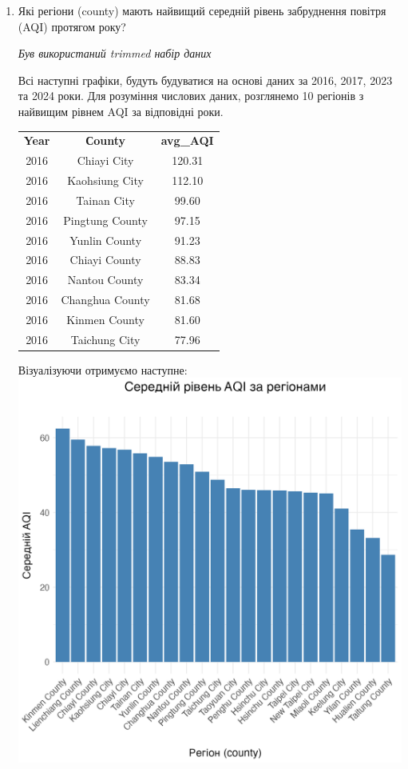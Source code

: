 \documentclass{article}
\begin{document}
\begin{enumerate}
    \item Які регіони (county) мають найвищий середній рівень забруднення повітря (AQI) протягом року?
    
    \quad \textit{Був використаний trimmed набір даних}

    Всі наступні графіки, будуть будуватися на основі даних за 2016, 2017, 2023 та 2024 роки.
    Для розуміння числових даних, розглянемо 10 регіонів з найвищим рівнем AQI за відповідні роки.
 
    \begin{tabular}{ccc}
        \textbf{Year} & \textbf{Сounty} & \textbf{avg\_AQI} \\
        2016 &       Chiayi City &   120.31 \\
        2016 &   Kaohsiung City &   112.10 \\
        2016 &       Tainan City &    99.60 \\
        2016 &   Pingtung County &    97.15 \\
        2016 &    Yunlin County &    91.23 \\
        2016 &    Chiayi County &    88.83 \\
        2016 &    Nantou County &    83.34 \\
        2016 &  Changhua County &    81.68 \\
        2016 &    Kinmen County &    81.60 \\
        2016 &   Taichung City &    77.96 \\
    \end{tabular}



    Візуалізуючи отримуємо наступне:
    \includegraphics[width=6in]{question4/avg_aqi_by_country.png}


\end{enumerate}
\end{document}
